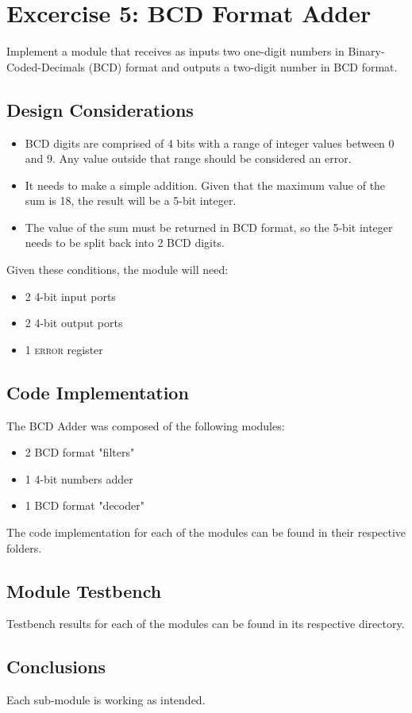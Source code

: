 \section {Excercise 5: BCD Format Adder}
Implement a module that receives as inputs two one-digit numbers in Binary-Coded-Decimals (BCD) format and outputs a two-digit number in BCD format.

\subsection{Design Considerations}
\begin{itemize}
\item BCD digits are comprised of 4 bits with a range of integer values between 0 and 9. Any value outside that range should be considered an error.
\item It needs to make a simple addition. Given that the maximum value of the sum is 18, the result will be a 5-bit integer.
\item The value of the sum must be returned in BCD format, so the 5-bit integer needs to be split back into 2 BCD digits.
\end{itemize}

Given these conditions, the module will need: 
\begin{itemize}
\item 2 4-bit input ports
\item 2 4-bit output ports
\item 1 \textsc{error} register
\end{itemize}

\subsection{Code Implementation}
The BCD Adder was composed of the following modules:
\begin{itemize}
\item 2 BCD format "filters"
\item 1 4-bit numbers adder
\item 1 BCD format "decoder"
\end{itemize}

The code implementation for each of the modules can be found in their respective folders.

\subsection{Module Testbench}
Testbench results for each of the modules can be found in its respective directory.

\subsection{Conclusions}
Each sub-module is working as intended.